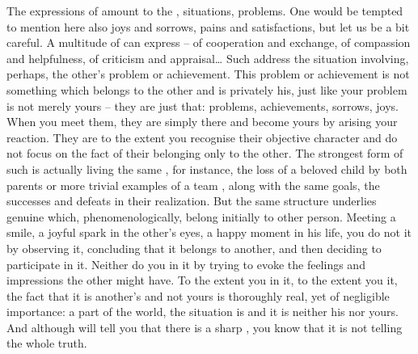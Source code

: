 \pa\act
The  expressions of  amount to  the
, situations, problems. One would be tempted to mention here
also joys and sorrows, pains and satisfactions, but let us be a bit careful. A
multitude of  can express  --  of cooperation and
exchange, of compassion and helpfulness, of criticism and appraisal\ldots
Such  address the  situation involving, perhaps, the other's
problem or achievement. This problem or achievement is not something which
belongs to the other and is privately his, just like {your} problem is not
merely {yours} -- they are just that: problems, achievements, sorrows, joys.
When {you} meet them, they are simply there and become {yours} by arising {your}
reaction.  They are  to the extent {you} recognise their objective
character and do not focus on the fact of their belonging only to the other.
The strongest form of such  is actually living the same
, for instance, the loss of a beloved child  by both
parents or more trivial examples of a team , along with the same
goals, the successes and defeats in their realization.  But the same structure
underlies genuine  which, phenomenologically, belong
initially to other person.  Meeting a smile, a joyful spark in the other's eyes,
a happy moment in his life, {you} do not  it by observing it,
concluding that it belongs to another, and then deciding to participate in it.
Neither do you  in it by trying to evoke the feelings and
impressions the other might have. To the extent {you}  in it, to
the extent {you}  it, the fact that it is another's and not {yours} is
thoroughly real, yet of negligible importance: a part of the world, the
 situation is  and it is neither his nor yours.  And
although  will tell you that there is a sharp ,
you know that it is not telling the whole truth.

